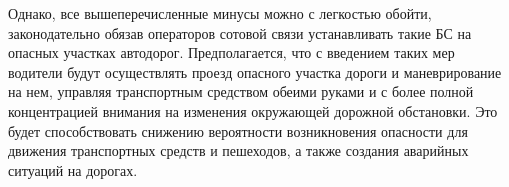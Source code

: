 Однако, все вышеперечисленные минусы можно с легкостью обойти, законодательно обязав операторов сотовой связи устанавливать такие БС на опасных участках автодорог. Предполагается, что с введением таких мер водители будут осуществлять проезд опасного участка дороги и маневрирование на нем, управляя транспортным средством обеими руками и с более полной концентрацией внимания на изменения окружающей дорожной обстановки. Это будет способствовать снижению вероятности возникновения опасности для движения транспортных средств и пешеходов, а также создания аварийных ситуаций на дорогах.